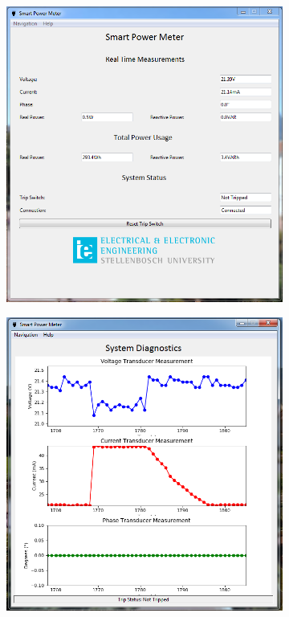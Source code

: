 \begin{figure}[ht]
 \footnotesize
 \centering
    \begin{subfigure}[]{0.45\textwidth}
              \centering
  		\includegraphics[width=1.0\linewidth]{./Figures/gui_home.PNG}
		    \caption{} \label{subfig:gui_home}
     \end{subfigure}
     \begin{subfigure}[]{0.45\textwidth}
             \centering
  		\includegraphics[width=1.0\linewidth]{./Figures/gui_meas.PNG}

\end{subfigure}
\end{figure}
